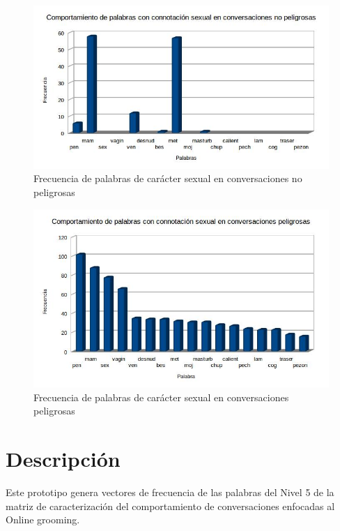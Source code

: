 \begin{figure}[h]
\begin{center}
	\includegraphics[scale=.4]{images/palabrassexuales1}
	\caption{Frecuencia de palabras de car\'acter sexual en conversaciones no peligrosas}
	\label{fig:graficasexual1}
\end{center}
\end{figure}


\begin{figure}[h]
\begin{center}
	\includegraphics[scale=.4]{images/palabrassexuales2}
	\caption{Frecuencia de palabras de car\'acter sexual en conversaciones peligrosas}
	\label{fig:graficasexual2}
\end{center}
\end{figure}

\section{Descripci\'on}

Este prototipo genera vectores de frecuencia de las palabras del Nivel 5 de la matriz de caracterizaci\'on del comportamiento de conversaciones enfocadas al Online grooming.
